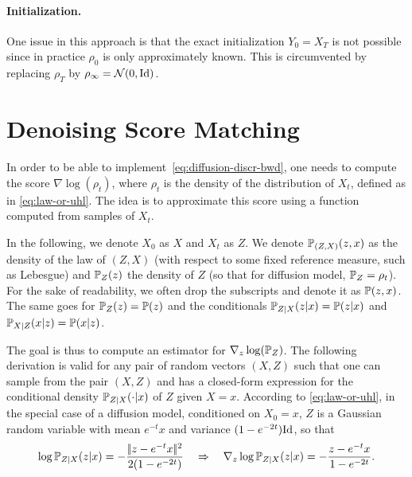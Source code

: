 \paragraph{Initialization.} One issue in this approach is that the exact initialization $Y_0=X_T$ is not possible since in practice $\rho_0$ is only approximately known. This is circumvented by replacing $\rho_T$ by $\rho_\infty = \mathcal{N}(0,\mathrm{Id})$.


\section{Denoising Score Matching}

In order to be able to implement~\eqref{eq:diffusion-discr-bwd}, one needs to compute the score $\nabla \log(\rho_t)$, where $\rho_t$ is the density of the distribution of $X_t$, defined as in \eqref{eq:law-or-uhl}. The idea is to approximate this score using a function computed from samples of $X_t$.

In the following, we denote $X_0$ as $X$ and $X_t$ as $Z$. 
%
We denote $\mathbb{P}_{(Z,X)}(z,x)$ as the density of the law of $(Z,X)$ (with respect to some fixed reference measure, such as Lebesgue) and $\mathbb{P}_Z(z)$ the density of $Z$ (so that for diffusion model,  $\mathbb{P}_Z=\rho_t$). 
%
For the sake of readability, we often drop the subscripts and denote it as $\mathbb{P}(z,x)$. The same goes for $\mathbb{P}_Z(z)=\mathbb{P}(z)$ and the conditionals $\mathbb{P}_{Z|X}(z|x)=\mathbb{P}(z|x)$ and $\mathbb{P}_{X|Z}(x|z)=\mathbb{P}(x|z)$. 

The goal is thus to compute an estimator for $\nabla_z \log(\mathbb{P}_Z)$.
%
The following derivation is valid for any pair of random vectors $(X,Z)$ such that one can sample from the pair $(X,Z)$ and has a closed-form expression for the conditional density $\mathbb{P}_{Z|X}(\cdot|x)$ of $Z$ given $X=x$. According to \eqref{eq:law-or-uhl}, in the special case of a diffusion model, conditioned on $X_0=x$, $Z$ is a Gaussian random variable with mean $e^{-t} x$ and variance $(1-e^{-2t}) \mathrm{Id}$, so that 
\begin{equation}
	\log \mathbb{P}_{Z|X}(z|x) =- \frac{|\!| z - e^{-t} x |\!|^2}{2 (1-e^{-2t})}
	\quad \Rightarrow \quad
	\nabla_z \log \mathbb{P}_{Z|X}(z|x) = - \frac{z-e^{-t} x}{1-e^{-2t}}.
\end{equation}


